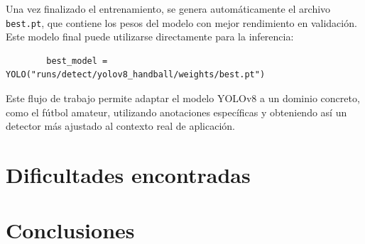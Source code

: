 \documentclass[12pt, a4paper, twoside]{article}
\begin{document}
	Una vez finalizado el entrenamiento, se genera automáticamente el archivo \texttt{best.pt}, que contiene los pesos del modelo con mejor rendimiento en validación. Este modelo final puede utilizarse directamente para la inferencia:
	
	\begin{verbatim}
		best_model = YOLO("runs/detect/yolov8_handball/weights/best.pt")
	\end{verbatim}
	
	Este flujo de trabajo permite adaptar el modelo YOLOv8 a un dominio concreto, como el fútbol amateur, utilizando anotaciones específicas y obteniendo así un detector más ajustado al contexto real de aplicación.
	
	
	\section{Dificultades encontradas}
	
	
	
	\section{Conclusiones}
	
	
	
	\printbibliography
	
	
	
	
\end{document}
